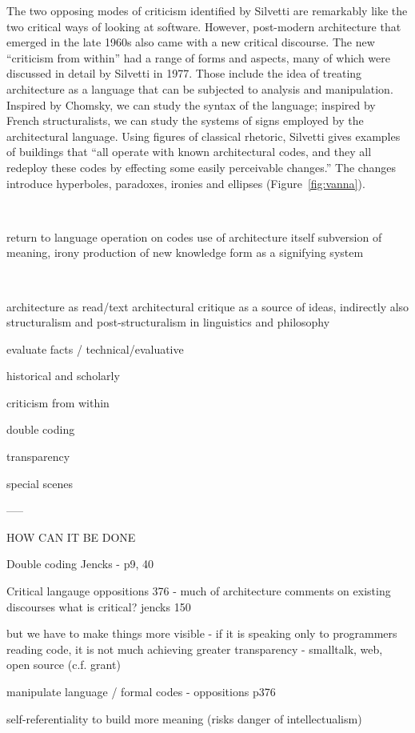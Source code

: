 The two opposing modes of criticism identified by Silvetti are remarkably like the two critical
ways of looking at software. However, post-modern architecture that emerged in the late 1960s
also came with a new critical discourse. The new ``criticism from within'' had a range of forms and
aspects, many of which were discussed in detail by Silvetti in 1977. Those include the idea of
treating architecture as a language that can be subjected to analysis and manipulation.
Inspired by Chomsky, we can study the syntax of the language; inspired by French structuralists,
we can study the systems of signs employed by the architectural language.
Using figures of classical rhetoric, Silvetti gives examples of buildings that ``all operate
with known architectural codes, and they all redeploy these codes by effecting some easily
perceivable changes.'' The changes introduce hyperboles,
paradoxes, ironies and ellipses (Figure~\ref{fig:vanna}).


~

return to language
operation on codes
use of architecture itself
subversion of meaning, irony
production of new knowledge
form as a signifying system

~


architecture as read/text
architectural critique as a source of ideas, indirectly also structuralism and post-structuralism in linguistics and philosophy

evaluate facts / technical/evaluative

historical and scholarly

criticism from within


double coding

transparency

special scenes


-----


HOW CAN IT BE DONE

Double coding
Jencks - p9, 40

Critical langauge
oppositions 376 - much of architecture comments on existing discourses
what is critical? jencks 150

but we have to make things more visible - if it is speaking only to programmers reading code,
it is not much
achieving greater transparency - smalltalk, web, open source (c.f. grant)

manipulate language / formal codes - oppositions p376

self-referentiality to build more meaning
  (risks danger of intellectualism)

